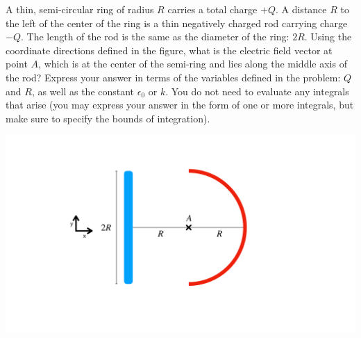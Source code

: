 \question A thin, semi-circular ring of radius $R$ carries a total charge $+Q$. A distance $R$ to the left of the center of the ring is a thin negatively charged rod carrying charge $-Q$. The length of the rod is the same as the diameter of the ring: $2R$. Using the coordinate directions defined in the figure, what is the electric field vector at point $A$, which is at the center of the semi-ring and lies along the middle axis of the rod? Express your answer in terms of the variables defined in the problem: $Q$ and $R$, as well as the constant $\epsilon_0$ or $k$. You do not need to evaluate any integrals that arise (you may express your answer in the form of one or more integrals, but make sure to specify the bounds of integration).
\begin{center}
	\includegraphics[width=.5\textwidth]{p6diag1}
\end{center}